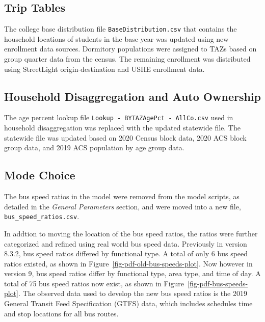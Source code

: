\documentclass[
  letterpaper,
  DIV=11,
  numbers=noendperiod,
  titlepage=false]{scrreprt}
\begin{document}
\hypertarget{trip-tables}{%
\subsection{Trip Tables}\label{trip-tables}}

The college base distribution file \texttt{BaseDistribution.csv} that
contains the household locations of students in the base year was
updated using new enrollment data sources. Dormitory populations were
assigned to TAZs based on group quarter data from the census. The
remaining enrollment was distributed using StreetLight
origin-destination and USHE enrollment data.

\hypertarget{household-disaggregation-and-auto-ownership}{%
\subsection{Household Disaggregation and Auto
Ownership}\label{household-disaggregation-and-auto-ownership}}

The age percent lookup file
\texttt{Lookup\ -\ BYTAZAgePct\ -\ AllCo.csv} used in household
disaggregation was replaced with the updated statewide file. The
statewide file was updated based on 2020 Census block data, 2020 ACS
block group data, and 2019 ACS population by age group data.

\hypertarget{mode-choice}{%
\subsection{Mode Choice}\label{mode-choice}}

The bus speed ratios in the model were removed from the model scripts,
as detailed in the \emph{General Parameters} section, and were moved
into a new file, \texttt{bus\_speed\_ratios.csv}.

In addtion to moving the location of the bus speed ratios, the ratios
were further categorized and refined using real world bus speed data.
Previously in version 8.3.2, bus speed ratios differed by functional
type. A total of only 6 bus speed ratios existed, as shown in
Figure~\ref{fig-pdf-old-bus-speeds-plot}. Now however in version 9, bus
speed ratios differ by functional type, area type, and time of day. A
total of 75 bus speed ratios now exist, as shown in
Figure~\ref{fig-pdf-bus-speeds-plot}. The observed data used to develop
the new bus speed ratios is the 2019 General Transit Feed Specification
(GTFS) data, which includes schedules time and stop locations for all
bus routes.
\end{document}
